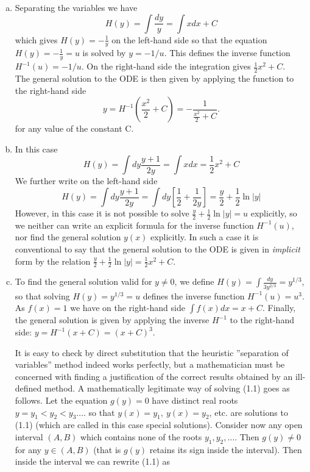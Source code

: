 \documentclass[11pt,a4paper,twoside]{article}
\begin{document}
	\begin{enumerate}[(a)]
			\item Separating the variables we have
			$$
			H(y) = \int \frac{dy}{y} = \int xdx + C
			$$
			which gives $H(y) = -\frac{1}{y}$ on the left-hand side so that the equation $H(y) = -\frac{1}{y} = u$ is solved by $y = -1/u$. This defines the inverse function $H^{-1}(u)= -1/u$.  On the right-hand side the integration gives $\frac{1}{2}x^2 + C$.\\
			The general solution to the ODE is then given by applying the function to the right-hand side
			$$
			y = H^{-1}\left(\frac{x^2}{2}+C\right) = - \frac{1}{\frac{x^2}{2}+C}.
			$$
			for any value of the constant C.
			\item In this case
			$$
			H(y) = \int dy \frac{y+1}{2y}
			= \int x dx
			= \frac{1}{2}x^2 + C
			$$
			We further write on the left-hand side
			$$
			H(y) = \int dy \frac{y + 1}{2y}
			= \int dy\left[\frac{1}{2}+\frac{1}{2y}\right]
			= \frac{y}{2} + \frac{1}{2}\ln \left\lvert y\right\rvert
			$$
			However, in this case it is not possible to solve $\frac{y}{2} + \frac{1}{2}\ln \left\lvert y\right\rvert = u$ explicitly, so we neither can write an explicit formula for the inverse function $H^{-1}(u)$, nor find the general solution $y(x)$ explicitly. In such a case it is conventional to say that the general solution to the ODE is
			given in \textit{implicit} form by the relation $\frac{y}{2} + \frac{1}{2}\ln \left\lvert y\right\rvert = \frac{1}{2}x^2 + C$.
			\item To find the general solution valid for $y \ne 0$, we define $H(y) = \int \frac{dy}{3y^{2/3}} = y^{1/3}$,  so that solving $H(y) = y^{1/3} = u$ defines the inverse function $H^{-1} (u) = u^3$. As $f(x) = 1$ we have on the right-hand side $\int f(x)dx = x + C$. Finally, the general solution is given by applying the inverse $H^{−1}$ to the right-hand side: $y = H^{−1}(x + C) = (x + C)^3$.\par
			It is easy to check by direct substitution that the heuristic ”separation of variables” method indeed works perfectly, but a mathematician must be concerned with finding a justification of the correct results obtained by an ill-defined method. A mathematically legitimate way of solving (1.1) goes as follows. Let the equation $g(y) = 0$ have distinct real roots $y = y_1 < y_2 < y_3 \ldots $. so that $y(x) = y_1,\ y(x) = y_2$, etc. are solutions to (1.1) (which are called in this case special solutions). Consider now any open interval $(A, B)$ which contains none of the
			roots $y_1, y_2,\ldots $. Then $g(y) \ne 0$ for any $y \in (A, B)$ (that is $g(y)$ retains its sign inside the interval). Then inside the interval we can rewrite (1.1) as

\end{enumerate}
\end{document}
